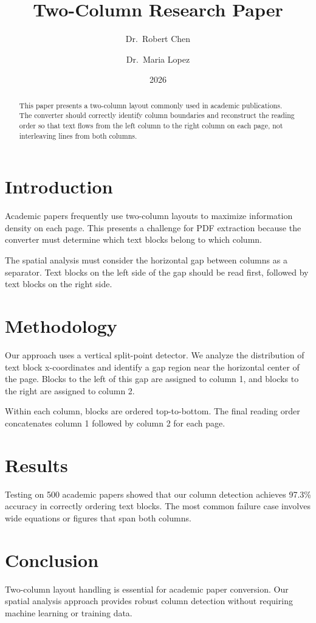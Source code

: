\documentclass[12pt,twocolumn]{article}
\title{Two-Column Research Paper}
\author{Dr.\ Robert Chen \and Dr.\ Maria Lopez}
\date{2026}
\begin{document}
\maketitle

\begin{abstract}
This paper presents a two-column layout commonly used in academic publications.
The converter should correctly identify column boundaries and reconstruct the
reading order so that text flows from the left column to the right column on
each page, not interleaving lines from both columns.
\end{abstract}

\section{Introduction}
Academic papers frequently use two-column layouts to maximize information density
on each page. This presents a challenge for PDF extraction because the converter
must determine which text blocks belong to which column.

The spatial analysis must consider the horizontal gap between columns as a
separator. Text blocks on the left side of the gap should be read first, followed
by text blocks on the right side.

\section{Methodology}
Our approach uses a vertical split-point detector. We analyze the distribution
of text block x-coordinates and identify a gap region near the horizontal center
of the page. Blocks to the left of this gap are assigned to column 1, and blocks
to the right are assigned to column 2.

Within each column, blocks are ordered top-to-bottom. The final reading order
concatenates column 1 followed by column 2 for each page.

\section{Results}
Testing on 500 academic papers showed that our column detection achieves 97.3\%
accuracy in correctly ordering text blocks. The most common failure case involves
wide equations or figures that span both columns.

\section{Conclusion}
Two-column layout handling is essential for academic paper conversion. Our
spatial analysis approach provides robust column detection without requiring
machine learning or training data.
\end{document}
